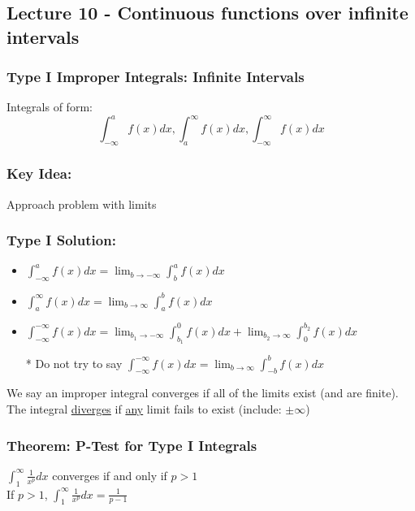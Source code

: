 \documentclass[12pt, letterpaper]{article}
\begin{document}
\subsection{Lecture 10 - Continuous functions over infinite intervals}
\subsubsection{Type I Improper Integrals: Infinite Intervals}
Integrals of form: \[\int_{-\infty}^{a}f(x)dx, \int_{a}^{\infty}f(x)dx, \int_{-\infty}^{\infty}f(x)dx\]
\subsubsection*{Key Idea: }
Approach problem with limits
\subsubsection{Type I Solution:}
\begin{itemize}
    \item $\displaystyle\int_{-\infty}^{a}f(x)dx = \lim_{b\to-\infty}\int_{b}^{a}f(x)dx$
    \item $\displaystyle\int_{a}^{\infty}f(x)dx = \lim_{b\to\infty}\int_{a}^{b}f(x)dx$ 
    \item $\displaystyle\int_{-\infty}^{-\infty}f(x)dx = \lim_{b_1\to-\infty}\int_{b_1}^{0}f(x)dx + \lim_{b_2\to\infty}\int_{0}^{b_2}f(x)dx$
    \item[*] Do not try to say $\displaystyle\int_{-\infty}^{-\infty}f(x)dx = \lim_{b\to\infty}\int_{-b}^{b}f(x)dx$
\end{itemize}
We say an improper integral converges if all of the limits exist (and are finite). The integral \underline{diverges} 
if \underline{any} limit fails to exist (include: $\pm\infty$)
\subsubsection{Theorem: P-Test for Type I Integrals}
$\displaystyle\int_{1}^{\infty}\frac{1}{x^p}dx$ converges if and only if $p>1$ \\
If $p > 1$, $\displaystyle\int_{1}^{\infty}\frac{1}{x^p}dx = \frac{1}{p-1}$
\end{document}
